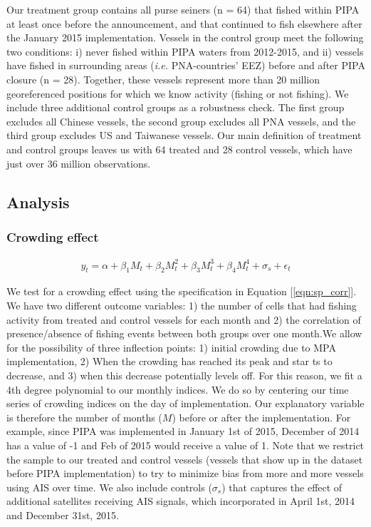 \documentclass[9p,twocolumn,twoside,lineno]{pnas-new}
\begin{document}
\begin{scriptsize}
Our treatment group contains all purse seiners (n = 64) that fished within PIPA at least once before the announcement, and that continued to fish elsewhere after the January 2015 implementation. Vessels in the control group meet the following two conditions: i) never fished within PIPA waters from 2012-2015, and ii) vessels have fished in surrounding areas (\emph{i.e.} PNA-countries' EEZ) before and after PIPA closure (n = 28). Together, these vessels represent more than 20 million georeferenced positions for which we know activity (fishing or not fishing). We include three additional control groups as a robustness check. The first group excludes all Chinese vessels, the second group excludes all PNA vessels, and the third group excludes US and Taiwanese vessels. Our main definition of treatment and control groups leaves us with 64 treated and 28 control vessels, which have just over 36 million observations.

\subsection{Analysis}

\subsubsection{Crowding effect}

\begin{figure}[H]
	\begin{align}
	y_t = \alpha + \beta_1 M_t + \beta_2 M_t^2 + \beta_3 M_t^3 + \beta_4 M_t ^4 + \sigma_s + \epsilon_t
	\label{eqn:sp_corr}
	\end{align}
\end{figure}

We test for a crowding effect using the specification in Equation [\ref{eqn:sp_corr}]. We have two different outcome variables:
1) the number of cells that had fishing activity from treated and control vessels for each month and 2) the correlation of presence/absence of fishing events between both groups over one month.We allow for the possibility of three inflection points: 1) initial crowding due to MPA implementation, 2) When the crowding has reached its peak and star  ts to decrease, and 3) when this decrease potentially levels off. For this reason, we fit a 4th degree polynomial to our monthly indices. We do so by centering our time series of crowding indices on the day of implementation. Our explanatory variable is therefore the number of months ($M$) before or after the implementation. For example, since PIPA was implemented in January 1st of 2015, December of 2014 has a value of -1 and Feb of 2015 would receive a value of 1. Note that we restrict the sample to our treated and control vessels (vessels that show up in the dataset before PIPA implementation) to try to minimize bias from more and more vessels using AIS over time. We also include controls ($\sigma_s$) that captures the effect of additional satellites receiving AIS signals, which incorporated in April 1st, 2014 and December 31st, 2015.


\end{scriptsize}
\end{document}
